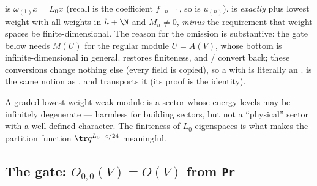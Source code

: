 \begin{dictionary}
 is $\omega_{(1)}x = L_0x$ (recall  is the coefficient $f_{-n-1}$, so
 is $u_{(n)}$).  is \emph{exactly}  plus lowest weight
 with all weights in $h+\N$ and $M_h\neq0$, \emph{minus} the requirement that weight spaces be finite-dimensional. The
reason for the omission is substantive: the gate below needs $M(U)$ for the regular module $U = A(V)$, whose bottom is
infinite-dimensional in general.  restores finiteness, and / convert
back; these conversions change nothing else (every field is copied), so a  with  is
literally an .  is the same notion as , and
 transports it (its proof is the identity).
\end{dictionary}

\begin{physics}
A graded lowest-weight weak module is a sector whose energy levels may be infinitely degenerate --- harmless for building
sectors, but not a ``physical'' sector with a well-defined character. The finiteness of $L_0$-eigenspaces is what makes the
partition function $\tr q^{L_0-c/24}$ meaningful.
\end{physics}

\subsection{The gate: \texorpdfstring{$O_{0,0}(V) = O(V)$}{O\_\{0,0\}(V)=O(V)} from \texttt{Pr}}

